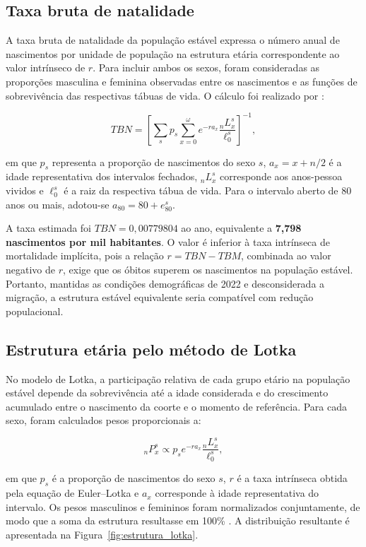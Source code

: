 \documentclass[a4paper,12pt]{article}
\begin{document}
\subsection{Taxa bruta de natalidade}

A taxa bruta de natalidade da população estável expressa o número anual de nascimentos por unidade de população na estrutura etária correspondente ao valor intrínseco de \(r\). Para incluir ambos os sexos, foram consideradas as proporções masculina e feminina observadas entre os nascimentos e as funções de sobrevivência das respectivas tábuas de vida. O cálculo foi realizado por \cite{grupofoz2021,preston2001}:

\begin{equation}
TBN =
\left[
\sum_s p_s
\sum_{x=0}^{\omega}
e^{-r a_x}
\frac{{}_nL_x^s}{\ell_0^s}
\right]^{-1},
\end{equation}

\noindent em que \(p_s\) representa a proporção de nascimentos do sexo \(s\), \(a_x=x+n/2\) é a idade representativa dos intervalos fechados, \({}_nL_x^s\) corresponde aos anos-pessoa vividos e \(\ell_0^s\) é a raiz da respectiva tábua de vida. Para o intervalo aberto de 80 anos ou mais, adotou-se \(a_{80}=80+e_{80}^s\).

A taxa estimada foi \(TBN=0{,}00779804\) ao ano, equivalente a \textbf{7,798 nascimentos por mil habitantes}. O valor é inferior à taxa intrínseca de mortalidade implícita, pois a relação \(r=TBN-TBM\), combinada ao valor negativo de \(r\), exige que os óbitos superem os nascimentos na população estável. Portanto, mantidas as condições demográficas de 2022 e desconsiderada a migração, a estrutura estável equivalente seria compatível com redução populacional.

\subsection{Estrutura etária pelo método de Lotka}

No modelo de Lotka, a participação relativa de cada grupo etário na população estável depende da sobrevivência até a idade considerada e do crescimento acumulado entre o nascimento da coorte e o momento de referência. Para cada sexo, foram calculados pesos proporcionais a:

\begin{equation}
{}_nP_x^s
\propto
p_s e^{-r a_x}
\frac{{}_nL_x^s}{\ell_0^s},
\end{equation}

\noindent em que \(p_s\) é a proporção de nascimentos do sexo \(s\), \(r\) é a taxa intrínseca 
obtida pela equação de Euler--Lotka e \(a_x\) corresponde à idade representativa do intervalo. 
Os pesos masculinos e femininos foram normalizados conjuntamente, de modo que a soma da 
estrutura resultasse em 100\% \cite{grupofoz2021,preston2001}. A distribuição resultante é apresentada na Figura~\ref{fig:estrutura_lotka}.
\end{document}
